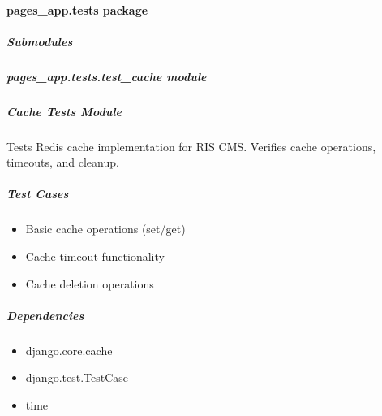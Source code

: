 \documentclass[letterpaper,10pt,english]{sphinxmanual}
\begin{document}
\sphinxstepscope


\paragraph{pages\_app.tests package}
\label{\detokenize{pages_app.tests:pages-app-tests-package}}\label{\detokenize{pages_app.tests::doc}}

\subparagraph{Submodules}
\label{\detokenize{pages_app.tests:submodules}}

\subparagraph{pages\_app.tests.test\_cache module}
\label{\detokenize{pages_app.tests:module-pages_app.tests.test_cache}}\label{\detokenize{pages_app.tests:pages-app-tests-test-cache-module}}

\subparagraph{Cache Tests Module}
\label{\detokenize{pages_app.tests:cache-tests-module}}
\sphinxAtStartPar
Tests Redis cache implementation for RIS CMS.
Verifies cache operations, timeouts, and cleanup.


\subparagraph{Test Cases}
\label{\detokenize{pages_app.tests:test-cases}}\begin{itemize}
\item {} 
\sphinxAtStartPar
Basic cache operations (set/get)

\item {} 
\sphinxAtStartPar
Cache timeout functionality

\item {} 
\sphinxAtStartPar
Cache deletion operations

\end{itemize}


\subparagraph{Dependencies}
\label{\detokenize{pages_app.tests:dependencies}}\begin{itemize}
\item {} 
\sphinxAtStartPar
django.core.cache

\item {} 
\sphinxAtStartPar
django.test.TestCase

\item {} 
\sphinxAtStartPar
time

\end{itemize}
\end{document}
